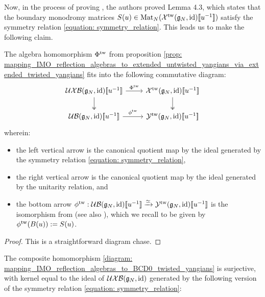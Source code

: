         Now, in the process of proving \cite[Theorem 4.1]{guay_regelskis_twisted_yangians_for_symmetric_pairs_of_types_BCD}, the authors proved Lemma 4.3, which states that the boundary monodromy matrices $S(u) \in \operatorname{Mat}_N( \mathcal{X}^{\mathrm{tw}}(\mathfrak{g}_N, \mathrm{id})[\![u^{-1}]\!] )$ satisfy the symmetry relation \eqref{equation: symmetry_relation}. This leads us to make the following claim.
        \begin{theorem} \label{theorem: IMO_reflection_algebras_vs_BCD0_twisted_yangians}
            The algebra homomorphism $\Phi^{\mathrm{tw}}$ from proposition \ref{prop: mapping_IMO_reflection_algebras_to_extended_untwisted_yangians_via_extended_twisted_yangians} fits into the following commutative diagram:
                $$
                    \begin{tikzcd}
                    {\UXB(\g_N, \id)[\![u^{-1}]\!]} & {\calX^{\tw}(\g_N, \id)[\![u^{-1}]\!]} \\
                    {\UB(\g_N, \id)[\![u^{-1}]\!]} & {\calY^{\tw}(\g_N, \id)[\![u^{-1}]\!]}
                    \arrow["{{\Phi^{\tw}}}", from=1-1, to=1-2]
                    \arrow[two heads, from=1-1, to=2-1]
                    \arrow[two heads, from=1-2, to=2-2]
                    \arrow["\phi^{\tw}", from=2-1, to=2-2]
                    \end{tikzcd}
                $$
            wherein:
            \begin{itemize}
                \item the left vertical arrow is the canonical quotient map by the ideal generated by the symmetry relation \eqref{equation: symmetry_relation},
                \item the right vertical arrow is the canonical quotient map by the ideal generated by the unitarity relation, and
                \item the bottom arrow $\phi^{\mathrm{tw}}: \mathcal{UB}(\mathfrak{g}_N, \mathrm{id})[\![u^{-1}]\!] \xrightarrow[]{\simeq} \mathcal{Y}^{\mathrm{tw}}(\mathfrak{g}_N, \mathrm{id})[\![u^{-1}]\!]$ is the isomorphism from \cite[Theorem 4.1]{guay_regelskis_twisted_yangians_for_symmetric_pairs_of_types_BCD} (see also \cite[Equation 4.32]{guay_regelskis_twisted_yangians_for_symmetric_pairs_of_types_BCD}), which we recall to be given by $\phi^{\mathrm{tw}}( B(u) ) := S(u)$. 
            \end{itemize}
        \end{theorem}
            \begin{proof}
                This is a straightforward diagram chase.
            \end{proof}
        \begin{corollary} \label{coro: IMO_reflection_algebras_vs_BCD0_twisted_yangians}
            The composite homomorphism \eqref{diagram: mapping_IMO_reflection_algebras_to_BCD0_twisted_yangians} is surjective, with kernel equal to the ideal of $\mathcal{UXB}(\mathfrak{g}_N, \mathrm{id})$ generated by the following version of the symmetry relation \eqref{equation: symmetry_relation}:
        \end{corollary}
